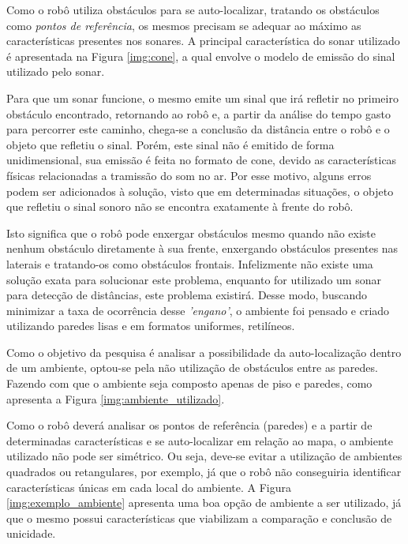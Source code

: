 	Como o robô utiliza obstáculos para se auto-localizar, tratando os obstáculos como \textit{pontos de referência}, os mesmos precisam se adequar ao máximo as características presentes nos sonares. A principal característica do sonar utilizado é apresentada na Figura \ref{img:cone}, a qual envolve o modelo de emissão do sinal utilizado pelo sonar.

	Para que um sonar funcione, o mesmo emite um sinal que irá refletir no primeiro obstáculo encontrado, retornando ao robô e, a partir da análise do tempo gasto para percorrer este caminho, chega-se a conclusão da distância entre o robô e o objeto que refletiu o sinal. Porém, este sinal não é emitido de forma unidimensional, sua emissão é feita no formato de cone, devido as características físicas relacionadas a tramissão do som no ar. Por esse motivo, alguns erros podem ser adicionados à solução, visto que em determinadas situações, o objeto que refletiu o sinal sonoro não se encontra exatamente à frente do robô.

	Isto significa que o robô pode enxergar obstáculos mesmo quando não existe nenhum obstáculo diretamente à sua frente, enxergando obstáculos presentes nas laterais e tratando-os como obstáculos frontais. Infelizmente não existe uma solução exata para solucionar este problema, enquanto for utilizado um sonar para detecção de distâncias, este problema existirá.
	Desse modo, buscando minimizar a taxa de ocorrência desse \textit{'engano'}, o ambiente foi pensado e criado utilizando paredes lisas e em formatos uniformes, retilíneos.

	Como o objetivo da pesquisa é analisar a possibilidade da auto-localização dentro de um ambiente, optou-se pela não utilização de obstáculos entre as paredes. Fazendo com que o ambiente seja composto apenas de piso e paredes, como apresenta a Figura \ref{img:ambiente_utilizado}.

	Como o robô deverá analisar os pontos de referência (paredes) e a partir de determinadas características e se auto-localizar em relação ao mapa, o ambiente utilizado não pode ser simétrico. Ou seja, deve-se evitar a utilização de ambientes quadrados ou retangulares, por exemplo, já que o robô não conseguiria identificar características únicas em cada local do ambiente.
	A Figura \ref{img:exemplo_ambiente} apresenta uma boa opção de ambiente a ser utilizado, já que o mesmo possui características que viabilizam a comparação e conclusão de unicidade.

